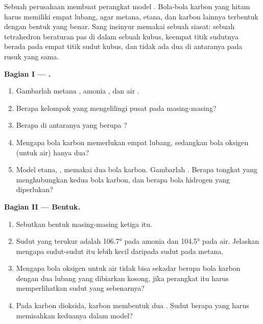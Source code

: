 \begin{problem}
\label{pb:g10:lewis-and-shape:1}
Sebuah perusahaan membuat perangkat model . Bola-bola karbon yang
hitam harus memiliki empat lubang, agar metana, etana, dan 
karbon lainnya terbentuk dengan bentuk yang benar. Sang insinyur memakai
sebuah siasat: sebuah tetrahedron beraturan pas di dalam sebuah kubus,
keempat titik sudutnya berada pada empat titik sudut kubus, dan tidak ada
dua di antaranya pada rusuk yang sama.

\medskip
\noindent\textbf{Bagian I --- .}
\begin{enumerate}
  \item Gambarlah  metana , amonia , dan
        air .
  \item Berapa kelompok  yang mengelilingi  pusat pada
        masing-masing?
  \item Berapa di antaranya yang berupa ?
  \item Mengapa bola karbon memerlukan empat lubang, sedangkan bola
        oksigen (untuk air) hanya dua?
  \item Model etana, , memakai dua bola karbon. Gambarlah
        . Berapa tongkat yang menghubungkan kedua bola
        karbon, dan berapa bola hidrogen yang diperlukan?
\end{enumerate}

\medskip
\noindent\textbf{Bagian II --- Bentuk.}
\begin{enumerate}[resume]
  \item Sebutkan bentuk masing-masing ketiga  itu.
  \item Sudut yang terukur adalah \ang{106.7} pada amonia dan
        \ang{104.5} pada air. Jelaskan mengapa sudut-sudut itu lebih kecil
        daripada sudut pada metana.
  \item Mengapa bola oksigen untuk air tidak bisa sekadar berupa bola
        karbon dengan dua lubang yang dibiarkan kosong, jika perangkat itu
        harus memperlihatkan sudut yang sebenarnya?
  \item Pada karbon dioksida,  karbon membentuk dua . Sudut berapa yang harus memisahkan keduanya dalam model?
\end{enumerate}


\end{problem}
